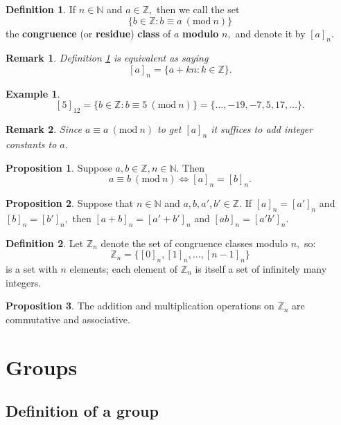 \documentclass[12pt, a4paper]{article}
\newcommand{\bb}[1]{\mathbb{#1}}
\newcommand{\Mod}[1]{\ (\mathrm{mod}\ #1)}
\newtheorem*{remark}{Remark}
\theoremstyle{definition}
\newtheorem{definition}{Definition}[section]
\newtheorem*{example}{Example}
\newtheorem{proposition}{Proposition}
\theoremstyle{plain}
\begin{document}
\begin{definition}\label{definition:congruence class}
If $n\in \bb{N}$ and $a\in \bb{Z},$ then we call the set $$\{b\in \bb{Z} : b \equiv a \Mod{n}\}$$ the \textbf{congruence} (or \textbf{residue}) \textbf{class} of $a$ \textbf{modulo} $n,$ and denote it by $[a]_n.$ 
\end{definition}

\begin{remark}
Definition \ref{definition:congruence class} is equivalent as saying $$[a]_n=\{a+kn : k \in \bb{Z}\}.$$
\end{remark}

\begin{example}
$$[5]_{12}=\{b\in\bb{Z} : b \equiv 5 \Mod{n}\}=\{\ldots,-19,-7,5,17,\ldots\}.$$
\end{example}

\begin{remark}
Since $a\equiv a \Mod{n}$ to get $[a]_n$ it suffices to add integer constants to $a.$
\end{remark}

\begin{proposition}
Suppose $a, b \in \bb{Z}, n \in \bb{N}.$ Then 
$$a\equiv b \Mod{n} \iff [a]_n=[b]_n.$$
\end{proposition}

\begin{proposition}
Suppose that $n \in \bb{N}$ and $a,b,a',b' \in \bb{Z}.$ If $[a]_n = [a']_n$ and $[b]_n = [b']_n,$ then $[a + b]_n = [a' + b']_n$ and $[ab]_n = [a'b']_n.$
\end{proposition}

\begin{definition}
Let $\bb{Z}_n$ denote the set of congruence classes modulo $n,$ so: $$\bb{Z}_n=\{[0]_n,[1]_n,\ldots,[n-1]_n\}$$ is a set with $n$ elements; each element of $\bb{Z}_n$ is itself a set of infinitely many integers.
\end{definition}

\begin{proposition}
The addition and multiplication operations on $\bb{Z}_n$ are commutative and associative.
\end{proposition}

\pagebreak

\section{Groups}

\subsection{Definition of a group}
\end{document}
